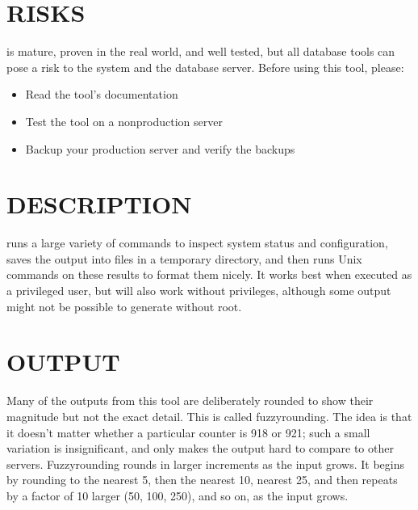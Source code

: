 \documentclass[letterpaper,10pt,english]{sphinxmanual}
\begin{document}
\section{RISKS}
\label{\detokenize{mariadb-system-summary:risks}}
 is mature, proven in the real world, and well tested,
but all database tools can pose a risk to the system and the database
server.  Before using this tool, please:
\begin{itemize}
\item {} 
Read the tool’s documentation

\item {} 
Test the tool on a non\sphinxhyphen{}production server

\item {} 
Backup your production server and verify the backups

\end{itemize}


\section{DESCRIPTION}
\label{\detokenize{mariadb-system-summary:description}}
 runs a large variety of commands to inspect system status and
configuration, saves the output into files in a temporary directory, and
then runs Unix commands on these results to format them nicely.  It works
best when executed as a privileged user, but will also work without privileges,
although some output might not be possible to generate without root.


\section{OUTPUT}
\label{\detokenize{mariadb-system-summary:output}}
Many of the outputs from this tool are deliberately rounded to show their
magnitude but not the exact detail. This is called fuzzy\sphinxhyphen{}rounding. The idea is
that it doesn’t matter whether a particular counter is 918 or 921; such a small
variation is insignificant, and only makes the output hard to compare to other
servers. Fuzzy\sphinxhyphen{}rounding rounds in larger increments as the input grows. It
begins by rounding to the nearest 5, then the nearest 10, nearest 25, and then
repeats by a factor of 10 larger (50, 100, 250), and so on, as the input grows.
\end{document}
